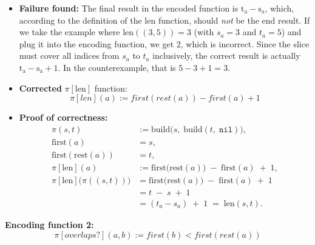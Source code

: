 \documentclass[10pt, a4paper]{article}
\begin{document}
\begin{itemize}
  \item \textbf{Failure found:} 
    The final result in the encoded function is 
    \(\mathrm{t_a} - \mathrm{s_a}\), which, according to the definition of the 
    \(\mathrm{len}\) function, should \emph{not} be the end result. 
    If we take the example where 
    \(\mathrm{len}((3,5)) = 3\) (with \(s_a = 3\) and \(t_a = 5\)) 
    and plug it into the encoding function, we get \(2\), which is incorrect. 
    Since the slice must cover all indices from \(s_a\) to \(t_a\) 
    inclusively, the correct result is actually 
    \(\mathrm{t_a} - \mathrm{s_a} + 1\). 
    In the counterexample, that is \(5 - 3 + 1 = 3\).

\item \textbf{Corrected} \(\pi[\mathrm{len}]\) function:
\[\pi[len](a) := first(rest(a)) - first(a) + 1\]

\item \textbf{Proof of correctness:}
  \begin{align*}
    \pi(s,t) &:= \mathrm{build}\bigl(s,\;\mathrm{build}(t,\;\mathtt{nil})\bigr), \\[6pt]
    \mathrm{first}(a) &= s, \\
    \mathrm{first}(\mathrm{rest}(a)) &= t, \\[6pt]
    \pi[\mathrm{len}](a) &:= \mathrm{first}\bigl(\mathrm{rest}(a)\bigr) 
      \;-\;\mathrm{first}(a) \;+\; 1, \\[6pt]
    \pi[\mathrm{len}]\bigl(\pi((s,t))\bigr)
      &= \mathrm{first}\bigl(\mathrm{rest}(a)\bigr) 
        \;-\;\mathrm{first}(a) 
        \;+\; 1 \\[4pt]
      &= t \;-\; s \;+\; 1 \\[4pt]
      &= (t_a - s_a) \;+\; 1 \;=\; \mathrm{len}(s,t).
  \end{align*}
\end{itemize}

\textbf{Encoding function 2:}
     \[\pi[overlaps?](a,b) := first(b) < first(rest(a))\]
\end{document}
